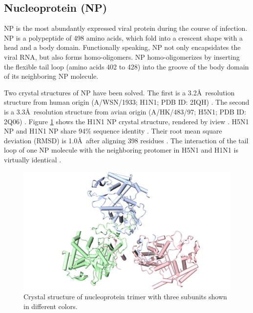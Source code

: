 \subsection{Nucleoprotein (NP)}

NP is the most abundantly expressed viral protein during the course of infection. NP is a polypeptide of 498 amino acids, which fold into a crescent shape with a head and a body domain. Functionally speaking, NP not only encapsidates the viral RNA, but also forms homo-oligomers. NP homo-oligomerizes by inserting the flexible tail loop (amino acids 402 to 428) into the groove of the body domain of its neighboring NP molecule.

Two crystal structures of NP have been solved. The first is a 3.2\AA\ resolution structure from human origin (A/WSN/1933; H1N1; PDB ID: 2IQH) \citep{1140}. The second is a 3.3\AA\ resolution structure from avian origin (A/HK/483/97; H5N1; PDB ID: 2Q06) \citep{1231}. Figure \ref{influenza:2IQH} shows the H1N1 NP crystal structure, rendered by iview \citep{1366}. H5N1 NP and H1N1 NP share 94\% sequence identity \citep{1231}. Their root mean square deviation (RMSD) is 1.0\AA\ after aligning 398 residues \citep{1231}. The interaction of the tail loop of one NP molecule with the neighboring protomer in H5N1 and H1N1 is virtually identical \citep{1231}.

\begin{figure}
\centering
\includegraphics[width=\linewidth]{../influenza/2IQH.png}
\caption{Crystal structure of nucleoprotein trimer with three subunits shown in different colors.}
\label{influenza:2IQH}
\end{figure}

